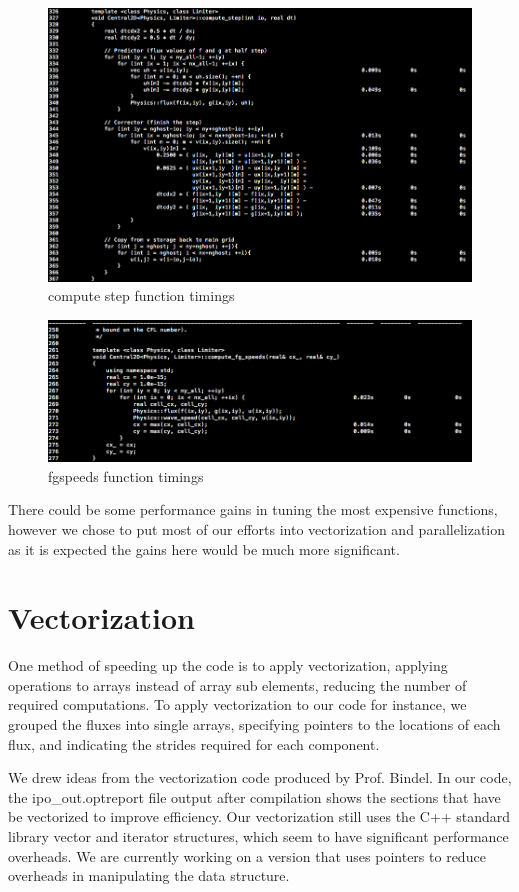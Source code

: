 \documentclass{article}
\begin{document}
 \begin{figure}[here]
  \centering
  \includegraphics[width=0.8\linewidth]{vtune_origcode_computestep.png}
  \caption{compute step function timings}
  \label{fig2}
\end{figure}

\begin{figure}[here]
  \centering
  \includegraphics[width=0.8\linewidth]{compute_fgspeeds_orig_vtune.png}
  \caption{fgspeeds function timings}
  \label{fig3}
\end{figure}

There could be some performance gains in tuning the most expensive functions, however we chose to put most of our efforts into vectorization and parallelization as it is expected the gains here would be much more significant.

\section*{Vectorization}

One method of speeding up the code is to apply vectorization, applying operations to arrays instead of array sub elements, reducing the number of required computations. To apply vectorization to our code for instance, we grouped the fluxes into single arrays, specifying pointers to the locations of each flux, and indicating the strides required for each component.   

We drew ideas from the vectorization code produced by Prof. Bindel. In our code, the ipo\_out.optreport file output after compilation shows the sections that have be vectorized to improve efficiency. Our vectorization still uses the C++ standard library vector and iterator structures, which seem to have significant performance overheads. We are currently working on a version that uses pointers to reduce overheads in manipulating the data structure.
\end{document}
